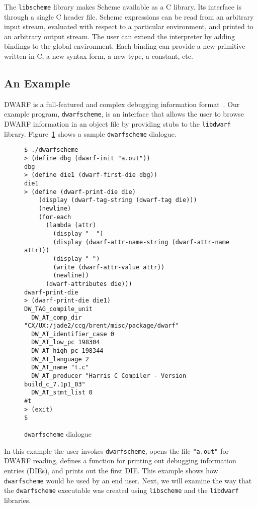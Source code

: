 The \verb+libscheme+ library makes Scheme available as a C library.
Its interface is through a single C header file.  Scheme expressions
can be read from an arbitrary input stream, evaluated with respect to
a particular environment, and printed to an arbitrary output stream.
The user can extend the interpreter by adding bindings to the global
environment.  Each binding can provide a new primitive written in C, a
new syntax form, a new type, a constant, etc.

\subsection{An Example}

DWARF is a full-featured and complex debugging information
format~\cite{bib:dwarf}.  Our example program, \verb+dwarfscheme+, is
an interface that allows the user to browse DWARF information in an
object file by providing stubs to the
\verb+libdwarf+~\cite{bib:libdwarf} library.
Figure~\ref{fig:dialogue} shows a sample \verb+dwarfscheme+ dialogue.

\begin{figure}[htbp]
\begin{center}
\begin{verbatim}
$ ./dwarfscheme
> (define dbg (dwarf-init "a.out"))
dbg
> (define die1 (dwarf-first-die dbg))
die1
> (define (dwarf-print-die die)
    (display (dwarf-tag-string (dwarf-tag die)))
    (newline)
    (for-each 
      (lambda (attr)
        (display "  ")
        (display (dwarf-attr-name-string (dwarf-attr-name attr)))
        (display " ")
        (write (dwarf-attr-value attr))
        (newline))
      (dwarf-attributes die)))
dwarf-print-die
> (dwarf-print-die die1)
DW_TAG_compile_unit
  DW_AT_comp_dir "CX/UX:/jade2/ccg/brent/misc/package/dwarf"
  DW_AT_identifier_case 0
  DW_AT_low_pc 198304
  DW_AT_high_pc 198344
  DW_AT_language 2
  DW_AT_name "t.c"
  DW_AT_producer "Harris C Compiler - Version build_c_7.1p1_03"
  DW_AT_stmt_list 0
#t
> (exit)
$ 
\end{verbatim}
\end{center}
  \caption{{\tt dwarfscheme} dialogue}
  \label{fig:dialogue}
\end{figure}

In this example the user invokes \verb+dwarfscheme+, opens the file
\verb+"a.out"+ for DWARF reading, defines a function for printing out
debugging information entries (DIEs), and prints out the first DIE.
This example shows how \verb+dwarfscheme+ would be used by an end
user.  Next, we will examine the way that the \verb+dwarfscheme+
executable was created using \verb+libscheme+ and the \verb+libdwarf+
libraries.


